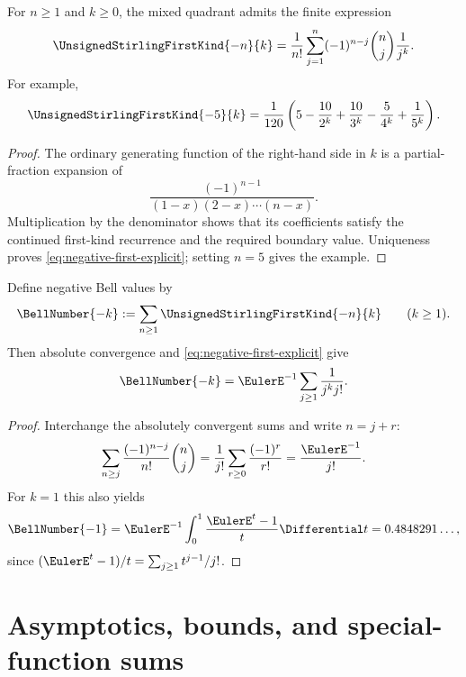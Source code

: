 \documentclass[11pt,a4paper,oneside,openany]{book}
\theoremstyle{definition}
\theoremstyle{remark}
\begin{document}
For $n\ge1$ and $k\ge0$, the mixed quadrant admits the finite expression
\begin{equation}\label{eq:negative-first-explicit}
 \UnsignedStirlingFirstKind{-n}{k}=\frac1{n!}\sum_{j=1}^n(-1)^{n-j}\binom nj\frac1{j^k}.
\end{equation}
For example,
\begin{equation}\label{eq:negative-first-five}
 \UnsignedStirlingFirstKind{-5}{k}=\frac1{120}
 \left(5-\frac{10}{2^k}+\frac{10}{3^k}-\frac5{4^k}+\frac1{5^k}\right).
\end{equation}
\begin{proof}
The ordinary generating function of the right-hand side in $k$ is a partial-fraction
expansion of
\[
 \frac{(-1)^{n-1}}{(1-x)(2-x)\cdots(n-x)}.
\]
Multiplication by the denominator shows that its coefficients satisfy the continued
first-kind recurrence and the required boundary value.  Uniqueness proves
\cref{eq:negative-first-explicit}; setting $n=5$ gives the example.
\end{proof}

Define negative Bell values by
\begin{equation}\label{eq:negative-bell-def}
 \BellNumber{-k}:=\sum_{n\ge1}\UnsignedStirlingFirstKind{-n}{k}\qquad(k\ge1).
\end{equation}
Then absolute convergence and \cref{eq:negative-first-explicit} give
\begin{equation}\label{eq:negative-dobinski}
 \BellNumber{-k}=\EulerE^{-1}\sum_{j\ge1}\frac1{j^k j!}.
\end{equation}
\begin{proof}
Interchange the absolutely convergent sums and write $n=j+r$:
\[
 \sum_{n\ge j}\frac{(-1)^{n-j}}{n!}\binom nj
 =\frac1{j!}\sum_{r\ge0}\frac{(-1)^r}{r!}=\frac{\EulerE^{-1}}{j!}.
\]
For $k=1$ this also yields
\[
 \BellNumber{-1}=\EulerE^{-1}\int_0^1\frac{\EulerE^t-1}{t}\Differential t
 =0.4848291\ldots,
\]
since $(\EulerE^t-1)/t=\sum_{j\ge1}t^{j-1}/j!$.
\end{proof}

\chapter{Asymptotics, bounds, and special-function sums}
\label{ch:stirling-asymptotics}
\end{document}
